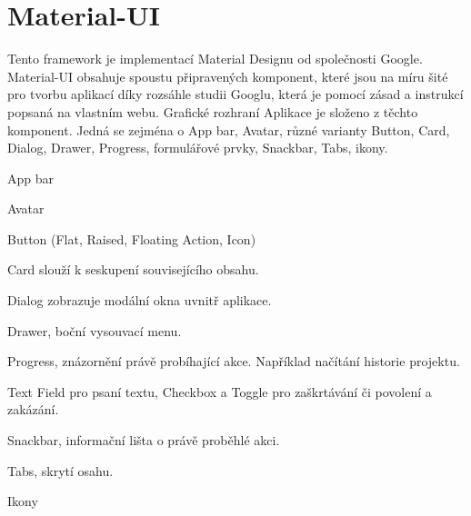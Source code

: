 \section{Material-UI}

Tento framework je implementací Material Designu od společnosti Google. Material-UI obsahuje spoustu připravených komponent, které jsou na míru šité pro tvorbu aplikací díky rozsáhle studii Googlu, která je pomocí zásad a instrukcí popsaná na vlastním webu. Grafické rozhraní Aplikace je složeno z těchto komponent. Jedná se zejména o App bar, Avatar, různé varianty Button, Card, Dialog, Drawer, Progress, formulářové prvky, Snackbar, Tabs, ikony.

App bar

Avatar

Button (Flat, Raised, Floating Action, Icon)

Card slouží k seskupení souvisejícího obsahu.

Dialog zobrazuje modální okna uvnitř aplikace.

Drawer, boční vysouvací menu.

Progress, znázornění právě probíhající akce. Například načítání historie projektu.

Text Field pro psaní textu, Checkbox a Toggle pro zaškrtávání či povolení a zakázání.

Snackbar, informační lišta o právě proběhlé akci.

Tabs, skrytí osahu.

Ikony

